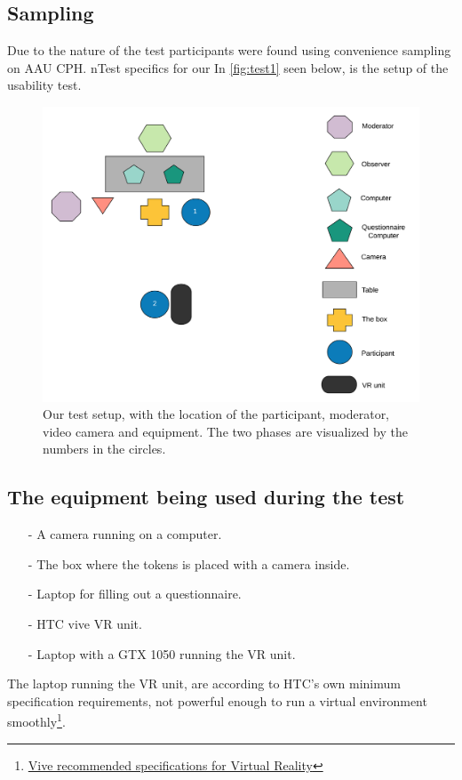 \subsection{Sampling}
Due to the nature of the test participants were found using convenience sampling on AAU CPH.
                                                                                 n{Test specifics}                           for our
In \autoref{fig:test1} seen below, is the setup of the usability test.

\begin{figure}[H]
	\centering
	\includegraphics[width=1\linewidth]{figure/Evaluation/Test1.png}
	\caption{Our test setup, with the location of the participant, moderator, video camera and equipment. The two phases are visualized by the numbers in the circles.}
	\label{fig:test1}
\end{figure}

\subsection*{The equipment being used during the test}
\begin{itemize}
	\item[-] A camera running on a computer.
	\item[-] The box where the tokens is placed with a camera inside.
	\item[-] Laptop for filling out a questionnaire.
	\item[-] HTC vive VR unit.
	\item[-] Laptop with a GTX 1050 running the VR unit.
\end{itemize}
The laptop running the VR unit, are according to HTC's own minimum specification requirements, not powerful enough to run a virtual environment smoothly\footnote{\href{https://www.vive.com/us/ready/}{\color{blue}Vive recommended specifications for Virtual Reality}}.
